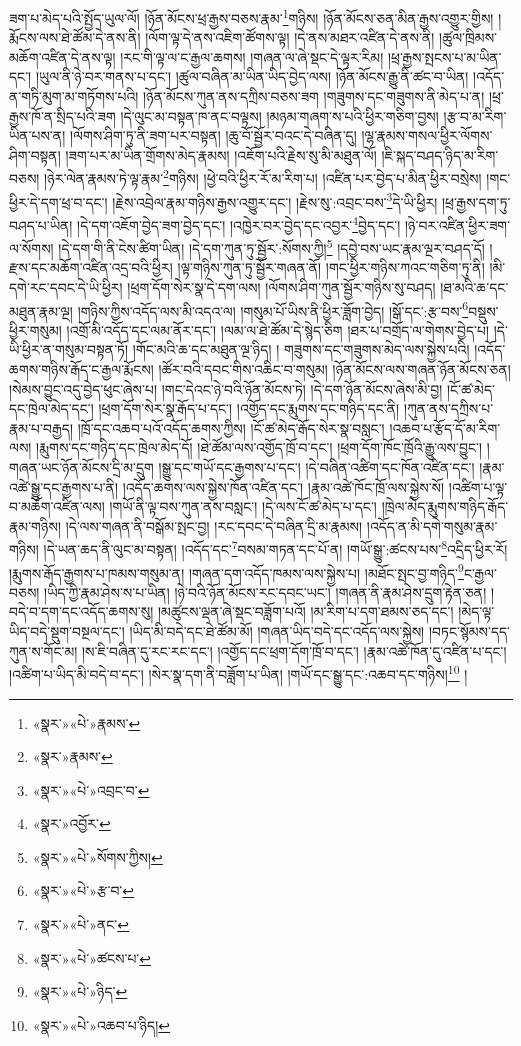 ཟག་པ་མེད་པའི་སྤྱོད་ཡུལ་ལོ། །ཉོན་མོངས་ཕྲ་རྒྱས་བཅས་རྣམ་\footnote{«སྣར་»«པེ་»རྣམས་}གཉིས། །ཉོན་མོངས་ཅན་མིན་རྒྱས་འགྱུར་གྱིས། །རྨོངས་ལས་ཐེ་ཚོམ་དེ་ནས་ནི། །ལོག་ལྟ་དེ་ནས་འཇིག་ཚོགས་ལྟ། །དེ་ནས་མཐར་འཛིན་དེ་ནས་ནི། །ཚུལ་ཁྲིམས་མཆོག་འཛིན་དེ་ནས་ལྟ། །རང་གི་ལྟ་ལ་ང་རྒྱལ་ཆགས། །གཞན་ལ་ཞེ་སྡང་དེ་ལྟར་རིམ། །ཕྲ་རྒྱས་སྤངས་པ་མ་ཡིན་དང་། །ཡུལ་ནི་ཉེ་བར་གནས་པ་དང་། །ཚུལ་བཞིན་མ་ཡིན་ཡིད་བྱེད་ལས། །ཉོན་མོངས་རྒྱུ་ནི་ཚང་བ་ཡིན། །འདོད་ན་གཏི་མུག་མ་གཏོགས་པའི། །ཉོན་མོངས་ཀུན་ནས་དཀྲིས་བཅས་ཟག །གཟུགས་དང་གཟུགས་ནི་མེད་པ་ན། །ཕྲ་རྒྱས་ཁོ་ན་སྲིད་པའི་ཟག །དེ་ལུང་མ་བསྟན་ཁ་ནང་བལྟས། །མཉམ་གཞག་ས་པའི་ཕྱིར་གཅིག་བྱས། །རྩ་བ་མ་རིག་ཡིན་པས་ན། །ལོགས་ཤིག་ཏུ་ནི་ཟག་པར་བསྟན། །ཆུ་བོ་སྦྱོར་བའང་དེ་བཞིན་དུ། །ལྷ་རྣམས་གསལ་ཕྱིར་ལོགས་ཤིག་བསྟན། །ཟག་པར་མ་ཡིན་གྲོགས་མེད་རྣམས། །འཇོག་པའི་རྗེས་སུ་མི་མཐུན་ལོ། །ཇི་སྐད་བཤད་ཉིད་མ་རིག་བཅས། །ཉེར་ལེན་རྣམས་ཏེ་ལྟ་རྣམ་\footnote{«སྣར་»རྣམས་}གཉིས། །ཕྱེ་བའི་ཕྱིར་རོ་མ་རིག་པ། །འཛིན་པར་བྱེད་པ་མིན་ཕྱིར་བསྲེས། །གང་ཕྱིར་དེ་དག་ཕྲ་བ་དང་། །རྗེས་འབྲེལ་རྣམ་གཉིས་རྒྱས་འགྱུར་དང་། །རྗེས་སུ་:འབྲང་བས་\footnote{«སྣར་»«པེ་»འབྲང་བ་}དེ་ཡི་ཕྱིར། །ཕྲ་རྒྱས་དག་ཏུ་བཤད་པ་ཡིན། །དེ་དག་འཇོག་བྱེད་ཟག་བྱེད་དང་། །འཁྱེར་བར་བྱེད་དང་འབྱར་\footnote{«སྣར་»འབྱོར་}བྱེད་དང་། །ཉེ་བར་འཛིན་ཕྱིར་ཟག་ལ་སོགས། །དེ་དག་གི་ནི་ངེས་ཚིག་ཡིན། །དེ་དག་ཀུན་ཏུ་སྦྱོར་:སོགས་ཀྱི།\footnote{«སྣར་»«པེ་»སོགས་ཀྱིས།} །དབྱེ་བས་ཡང་རྣམ་ལྔར་བཤད་དོ། །རྫས་དང་མཆོག་འཛིན་འདྲ་བའི་ཕྱིར། །ལྟ་གཉིས་ཀུན་ཏུ་སྦྱོར་གཞན་ནོ། །གང་ཕྱིར་གཉིས་ཀའང་གཅིག་ཏུ་ནི། །མི་དགེ་རང་དབང་དེ་ཡི་ཕྱིར། །ཕྲག་དོག་སེར་སྣ་དེ་དག་ལས། །ལོགས་ཤིག་ཀུན་སྦྱོར་གཉིས་སུ་བཤད། །ཐ་མའི་ཆ་དང་མཐུན་རྣམ་ལྔ། །གཉིས་ཀྱིས་འདོད་ལས་མི་འདའ་ལ། །གསུམ་པོ་ཡིས་ནི་ཕྱིར་ཟློག་བྱེད། །སྒོ་དང་:རྩ་བས་\footnote{«སྣར་»«པེ་»རྩ་བ་}བསྡུས་ཕྱིར་གསུམ། །འགྲོ་མི་འདོད་དང་ལམ་ནོར་དང་། །ལམ་ལ་ཐེ་ཚོམ་དེ་སྙེད་ཅིག །ཐར་པ་བགྲོད་ལ་གེགས་བྱེད་པ། །དེ་ཡི་ཕྱིར་ན་གསུམ་བསྟན་ཏོ། །གོང་མའི་ཆ་དང་མཐུན་ལྔ་ཉིད། །
གཟུགས་དང་གཟུགས་མེད་ལས་སྐྱེས་པའི། །འདོད་ཆགས་གཉིས་རྒོད་ང་རྒྱལ་རྨོངས། །ཚོར་བའི་དབང་གིས་འཆིང་བ་གསུམ། །ཉོན་མོངས་ལས་གཞན་ཉོན་མོངས་ཅན། །སེམས་བྱུང་འདུ་བྱེད་ཕུང་ཞེས་པ། །གང་དེའང་ཉེ་བའི་ཉོན་མོངས་ཏེ། །དེ་དག་ཉོན་མོངས་ཞེས་མི་བྱ། །ངོ་ཚ་མེད་དང་ཁྲེལ་མེད་དང་། །ཕྲག་དོག་སེར་སྣ་རྒོད་པ་དང་། །འགྱོད་དང་རྨུགས་དང་གཉིད་དང་ནི། །ཀུན་ནས་དཀྲིས་པ་རྣམ་པ་བརྒྱད། །ཁྲོ་དང་འཆབ་པའོ་འདོད་ཆགས་ཀྱིས། །ངོ་ཚ་མེད་རྒོད་སེར་སྣ་བསླང་། །འཆབ་པ་རྩོད་དོ་མ་རིག་ལས། །རྨུགས་དང་གཉིད་དང་ཁྲེལ་མེད་དོ། །ཐེ་ཚོམ་ལས་འགྱོད་ཁྲོ་བ་དང་། །ཕྲག་དོག་ཁོང་ཁྲོའི་རྒྱུ་ལས་བྱུང་། །གཞན་ཡང་ཉོན་མོངས་དྲི་མ་དྲུག །སྒྱུ་དང་གཡོ་དང་རྒྱགས་པ་དང་། །དེ་བཞིན་འཚིག་དང་ཁོན་འཛིན་དང་། །རྣམ་འཚེ་སྒྱུ་དང་རྒྱགས་པ་ནི། །འདོད་ཆགས་ལས་སྐྱེས་ཁོན་འཛིན་དང་། །རྣམ་འཚེ་ཁོང་ཁྲོ་ལས་སྐྱེས་སོ། །འཚིག་པ་ལྟ་བ་མཆོག་འཛིན་ལས། །གཡོ་ནི་ལྟ་བས་ཀུན་ནས་བསླང་། །དེ་ལས་ངོ་ཚ་མེད་པ་དང་། །ཁྲེལ་མེད་རྨུགས་གཉིད་རྒོད་རྣམ་གཉིས། །དེ་ལས་གཞན་ནི་བསྒོམ་སྤང་བྱ། །རང་དབང་དེ་བཞིན་དྲི་མ་རྣམས། །འདོད་ན་མི་དགེ་གསུམ་རྣམ་གཉིས། །དེ་ཡན་ཆད་ནི་ལུང་མ་བསྟན། །འདོད་དང་\footnote{«སྣར་»«པེ་»ནང་}བསམ་གཏན་དང་པོ་ན། །གཡོ་སྒྱུ་:ཚངས་པས་\footnote{«སྣར་»«པེ་»ཚངས་པ་}འདྲིད་ཕྱིར་རོ། །རྨུགས་རྒོད་རྒྱགས་པ་ཁམས་གསུམ་ན། །གཞན་དག་འདོད་ཁམས་ལས་སྐྱེས་པ། །མཐོང་སྤང་བྱ་གཉིད་\footnote{«སྣར་»«པེ་»ཉིད་}ང་རྒྱལ་བཅས། །ཡིད་ཀྱི་རྣམ་ཤེས་ས་པ་ཡིན། །ཉེ་བའི་ཉོན་མོངས་རང་དབང་ཡང་། །གཞན་ནི་རྣམ་ཤེས་དྲུག་རྟེན་ཅན། །བདེ་བ་དག་དང་འདོད་ཆགས་སུ། །མཚུངས་ལྡན་ཞེ་སྡང་བཟློག་པའོ། །མ་རིག་པ་དག་ཐམས་ཅད་དང་། །མེད་ལྟ་ཡིད་བདེ་སྡུག་བསྔལ་དང་། །ཡིད་མི་བདེ་དང་ཐེ་ཚོམ་མོ། །གཞན་ཡིད་བདེ་དང་འདོད་ལས་སྐྱེས། །བཏང་སྙོམས་དད་ཀུན་ས་གོང་མ། །ས་ཇི་བཞིན་དུ་རང་རང་དང་། །འགྱོད་དང་ཕྲག་དོག་ཁྲོ་བ་དང་། །རྣམ་འཚེ་ཁོན་དུ་འཛིན་པ་དང་། །འཚིག་པ་ཡིད་མི་བདེ་བ་དང་། །སེར་སྣ་དག་ནི་བཟློག་པ་ཡིན། །གཡོ་དང་སྒྱུ་དང་:འཆབ་དང་གཉིས།\footnote{«སྣར་»«པེ་»འཆབ་པ་ཉིད།} །
